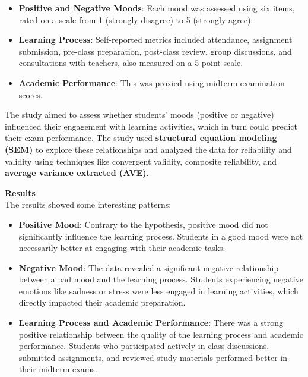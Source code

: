 \begin{itemize}
    \item \textbf{Positive and Negative Moods}: Each mood was assessed using six items, rated on a scale from 1 (strongly disagree) to 5 (strongly agree).
    \item \textbf{Learning Process}: Self-reported metrics included attendance, assignment submission, pre-class preparation, post-class review, group discussions, and consultations with teachers, also measured on a 5-point scale.
    \item \textbf{Academic Performance}: This was proxied using midterm examination scores.
\end{itemize}

\noindent The study aimed to assess whether students' moods (positive or negative) influenced their engagement with learning activities, which in turn could predict their exam performance. The study used \textbf{structural equation modeling (SEM)} to explore these relationships and analyzed the data for reliability and validity using techniques like convergent validity, composite reliability, and \textbf{average variance extracted (AVE)}.

\vspace{5mm}

\noindent \textbf{Results} \\
The results showed some interesting patterns:

\begin{itemize}
    \item \textbf{Positive Mood}: Contrary to the hypothesis, positive mood did not significantly influence the learning process. Students in a good mood were not necessarily better at engaging with their academic tasks.
    \item \textbf{Negative Mood}: The data revealed a significant negative relationship between a bad mood and the learning process. Students experiencing negative emotions like sadness or stress were less engaged in learning activities, which directly impacted their academic preparation.
    \item \textbf{Learning Process and Academic Performance}: There was a strong positive relationship between the quality of the learning process and academic performance. Students who participated actively in class discussions, submitted assignments, and reviewed study materials performed better in their midterm exams.
\end{itemize} 

\vspace{5mm}

